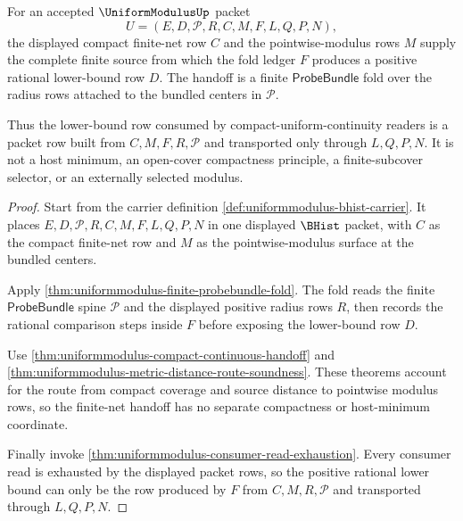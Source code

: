 \begin{theorem}
\label{thm:uniform-modulus-finite-net-minimum-handoff}
For an accepted $\UniformModulusUp$ packet
$$
U=(E,D,\mathcal{P},R,C,M,F,L,Q,P,N),
$$
the displayed compact finite-net row $C$ and the pointwise-modulus rows $M$ supply the complete finite source from which the fold ledger $F$ produces a positive rational lower-bound row $D$. The handoff is a finite $\mathsf{ProbeBundle}$ fold over the radius rows attached to the bundled centers in $\mathcal{P}$.

Thus the lower-bound row consumed by compact-uniform-continuity readers is a packet row built from $C,M,F,R,\mathcal{P}$ and transported only through $L,Q,P,N$. It is not a host minimum, an open-cover compactness principle, a finite-subcover selector, or an externally selected modulus.
\end{theorem}
\begin{proof}
Start from the carrier definition \autoref{def:uniformmodulus-bhist-carrier}. It places $E,D,\mathcal{P},R,C,M,F,L,Q,P,N$ in one displayed $\BHist$ packet, with $C$ as the compact finite-net row and $M$ as the pointwise-modulus surface at the bundled centers.

Apply \autoref{thm:uniformmodulus-finite-probebundle-fold}. The fold reads the finite $\mathsf{ProbeBundle}$ spine $\mathcal{P}$ and the displayed positive radius rows $R$, then records the rational comparison steps inside $F$ before exposing the lower-bound row $D$.

Use \autoref{thm:uniformmodulus-compact-continuous-handoff} and \autoref{thm:uniformmodulus-metric-distance-route-soundness}. These theorems account for the route from compact coverage and source distance to pointwise modulus rows, so the finite-net handoff has no separate compactness or host-minimum coordinate.

Finally invoke \autoref{thm:uniformmodulus-consumer-read-exhaustion}. Every consumer read is exhausted by the displayed packet rows, so the positive rational lower bound can only be the row produced by $F$ from $C,M,R,\mathcal{P}$ and transported through $L,Q,P,N$.
\end{proof}


